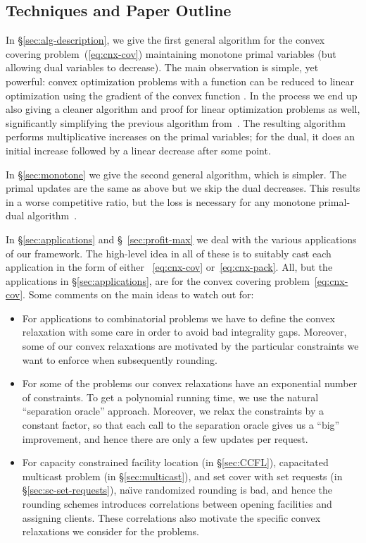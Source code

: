 \documentclass[letterpaper,11pt]{article}
\begin{document}
\subsection{Techniques and Paper Outline}
\label{sec:outline}

In \S\ref{sec:alg-description}, we give the first general algorithm for the
convex covering problem~(\ref{eq:cnx-cov}) maintaining monotone primal
variables (but allowing dual variables to decrease). The main
observation is simple, yet powerful: convex
optimization problems with a function  can be reduced to linear optimization using the
gradient of the convex function . In the process we end up also
giving a cleaner algorithm and proof for linear optimization problems
as well, significantly simplifying the previous algorithm
from~\cite{GN12-mor}.  The resulting algorithm performs multiplicative
increases on the primal variables; for the dual, it does an initial
increase followed by a linear decrease after some point.

In \S\ref{sec:monotone} we give the second general algorithm, which is
simpler. The primal updates are the same as above but we skip the dual
decreases. This results in a worse competitive ratio, but the loss is
necessary for any monotone primal-dual
algorithm~\cite{BN-MOR}.

In \S\ref{sec:applications} and \S~\ref{sec:profit-max} we deal with the
various applications of our framework. The high-level idea in all of these
is to suitably cast each application in the form of either ~\eqref{eq:cnx-cov}
or~\eqref{eq:cnx-pack}. All, but the applications in
\S\ref{sec:applications}, are for the convex covering problem~\eqref{eq:cnx-cov}. Some
comments on the main ideas to watch out for:
\begin{itemize}
\item For applications to combinatorial problems we have to define the
  convex relaxation with some care in order to avoid bad integrality
  gaps. Moreover, some of our convex relaxations are motivated by the
  particular constraints we want to enforce when
  subsequently rounding.

\item For some of the problems our convex relaxations have an
  exponential number of constraints. To get a polynomial running time,
  we use the natural ``separation oracle'' approach. Moreover, we relax
  the constraints by a constant factor, so that each call to the
  separation oracle gives us a ``big'' improvement, and hence there are
  only a few updates per request.

\item For capacity constrained facility location (in \S\ref{sec:CCFL}),
  capacitated multicast problem (in \S\ref{sec:multicast}), and set
  cover with set requests (in \S\ref{sec:sc-set-requests}), na\"{\i}ve
  randomized rounding is bad, and hence the rounding schemes introduces
  correlations between opening facilities and assigning clients. These
  correlations also motivate the specific convex relaxations we consider
  for the problems.
\end{itemize}
\end{document}
